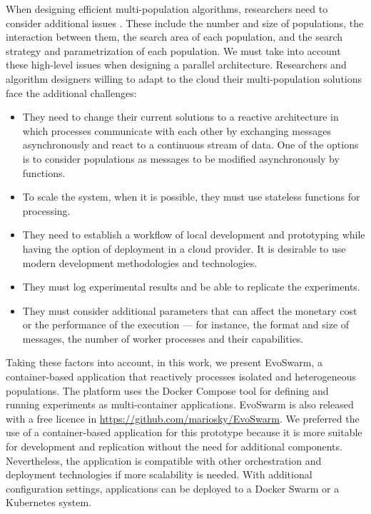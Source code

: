 \documentclass[review]{elsarticle}
\begin{document}
When designing efficient multi-population algorithms, researchers need to
consider additional issues \cite{Ma2019}. These include the number and size of populations,
the interaction between them, the search area of each population, and the search
strategy and parametrization of each population. We must take into account
these high-level issues when designing a parallel architecture. Researchers 
and algorithm designers willing to  adapt to the cloud their
multi-population solutions face the additional challenges:
\begin{itemize}
    \item They need to change their current solutions to a reactive architecture in which processes
    communicate with each other by exchanging messages asynchronously and react
    to a continuous stream of data. One of the options is to consider
    populations as messages to be modified asynchronously by functions. 

    \item To scale the system, when it is possible, they must use stateless functions for
    processing. 

    \item They need to establish a workflow of local development and prototyping while having the 
    option of deployment in a cloud provider. It is desirable to use modern development methodologies and technologies. 

    \item They must log experimental results and be able to replicate the experiments. 

    \item They must consider additional parameters that can affect the monetary cost or the performance of the
    execution — for instance, the format and size of messages, the number of
    worker processes and their capabilities.  
\end{itemize}

Taking these factors into account, in this work, we present EvoSwarm, 
a container-based application that reactively processes
isolated and
heterogeneous populations. The platform uses the Docker Compose tool for
defining and running experiments as multi-container applications. EvoSwarm is also released with a free licence in \url{https://github.com/mariosky/EvoSwarm}.
We preferred the use of a container-based application for this prototype because
it is more suitable for development and replication without the need for
additional components. Nevertheless, the application is compatible with other
orchestration and deployment technologies if more scalability is needed. 
With additional configuration settings, applications can be deployed 
to a Docker Swarm or a Kubernetes system.  
\end{document}

